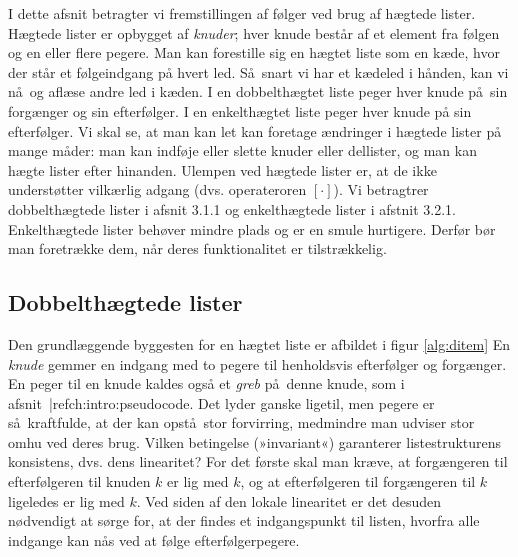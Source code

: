 I dette afsnit betragter vi fremstillingen af følger ved brug af hægtede lister.
Hægtede lister er opbygget af \emph{knuder};
hver knude består af et element fra følgen og en eller flere pegere.
Man kan forestille sig en hægtet liste som en kæde, hvor der står et følgeindgang på hvert led.
Så snart vi har et kædeled i hånden, kan vi nå og aflæse andre led i kæden.
I en dobbelthægtet liste peger hver knude på sin forgænger og sin efterfølger.
I en enkelthægtet liste peger hver knude på sin efterfølger.
Vi skal se, at man kan let kan foretage ændringer i  hægtede lister på mange måder:
man kan indføje eller slette knuder eller dellister, og man kan hægte lister efter hinanden.
Ulempen ved hægtede lister er, at de ikke understøtter vilkærlig adgang (dvs. operateroren $[\cdot]$).
Vi betragtrer dobbelthægtede lister i afsnit 3.1.1 og enkelthægtede lister i afstnit 3.2.1.
Enkelthægtede lister behøver mindre plads og er en smule hurtigere.
Derfør bør man foretrække dem, når deres funktionalitet er tilstrækkelig.

\subsection{Dobbelthægtede lister}

Den grundlæggende byggesten for en hægtet liste er afbildet i figur \ref{alg:ditem}
En \emph{knude}  gemmer en indgang med to pegere til henholdsvis efterfølger og forgænger.
En peger til en knude kaldes også et \emph{greb}
på denne knude, som i afsnit~|ref{ch:intro:pseudocode}.
Det lyder ganske ligetil, men pegere er så kraftfulde, at der kan opstå stor forvirring, medmindre man udviser stor omhu ved deres brug.
Vilken betingelse (»invariant«) garanterer listestrukturens konsistens, dvs. dens linearitet?
For det første skal man kræve, at forgængeren til efterfølgeren til knuden $k$ er lig med $k$, og at efterfølgeren til forgængeren til $k$ ligeledes er lig med $k$.
Ved siden af den lokale linearitet er det desuden nødvendigt at sørge for, at der findes et indgangspunkt til listen, hvorfra alle indgange kan nås ved at følge efterfølgerpegere.

